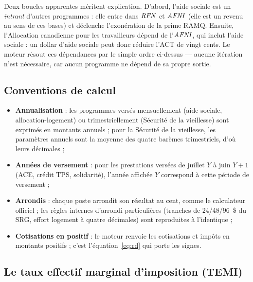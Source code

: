 Deux \og boucles \fg{} apparentes méritent explication. D'abord, l'aide
sociale est un \emph{intrant} d'autres programmes : elle entre dans $\mathit{RFN}$ et
$\mathit{AFNI}$ (elle est un revenu au sens de ces bases) et déclenche l'exonération
de la prime RAMQ. Ensuite, l'Allocation canadienne pour les travailleurs
dépend de l'$\mathit{AFNI}$, qui inclut l'aide sociale : un dollar d'aide sociale
peut donc réduire l'ACT de vingt cents. Le moteur résout ces dépendances par
le simple ordre ci-dessus --- aucune itération n'est nécessaire, car aucun
programme ne dépend de sa propre sortie.

\subsection{Conventions de calcul}

\begin{itemize}
  \item \textbf{Annualisation} : les programmes versés mensuellement (aide
        sociale, allocation-logement) ou trimestriellement (Sécurité de la
        vieillesse) sont exprimés en montants annuels ; pour la Sécurité de
        la vieillesse, les paramètres annuels sont la moyenne des quatre
        barèmes trimestriels, d'où leurs décimales ;
  \item \textbf{Années de versement} : pour les prestations versées de
        juillet $Y$ à juin $Y{+}1$ (ACE, crédit TPS, solidarité), l'année
        affichée $Y$ correspond à cette période de versement ;
  \item \textbf{Arrondis} : chaque poste arrondit son résultat au cent,
        comme le calculateur officiel ; les règles internes d'arrondi
        particulières (tranches de 24/48/96~\$ du SRG, effort logement à
        quatre décimales) sont reproduites à l'identique ;
  \item \textbf{Cotisations en positif} : le moteur renvoie les cotisations
        et impôts en montants positifs ; c'est l'équation~\eqref{eq:rd} qui
        porte les signes.
\end{itemize}



\subsection{Le taux effectif marginal d'imposition (TEMI)}
\label{sec:temi}

